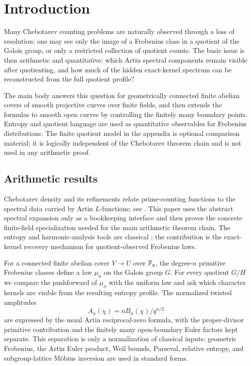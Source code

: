 \section{Introduction}\label{sec:introduction}
Many Chebotarev counting problems are naturally observed through a loss of resolution: one may see only the image of a Frobenius class in a quotient of the Galois group, or only a restricted collection of quotient counts. The basic issue is then arithmetic and quantitative: which Artin spectral components remain visible after quotienting, and how much of the hidden exact-kernel spectrum can be reconstructed from the full quotient profile?

The main body answers this question for geometrically connected finite \etale{} abelian covers of smooth projective curves over finite fields, and then extends the formulas to smooth open curves by controlling the finitely many boundary points. Entropy and quotient language are used as quantitative observables for Frobenius distributions. The finite quotient model in the appendix is optional comparison material; it is logically independent of the Chebotarev theorem chain and is not used in any arithmetic proof.

\subsection{Arithmetic results}
Chebotarev density and its refinements relate prime-counting functions to the spectral data carried by Artin \(L\)-functions; see \cite{Tschebotareff1926,Serre1981,NeukirchSchmidtWingberg2008}. This paper uses the abstract spectral expansion only as a bookkeeping interface and then proves the concrete finite-field specialization needed for the main arithmetic theorem chain. The entropy and harmonic-analysis tools are classical \cite{CoverThomas2006,CsiszarKorner2011,DemboZeitouni1998,Diaconis1988,Terras1999}; the contribution is the exact-kernel recovery mechanism for quotient-observed Frobenius laws.

For a connected finite \etale{} abelian cover \(V\to U\) over \(\mathbb{F}_q\), the degree-\(n\) primitive Frobenius classes define a law \(\mu_n\) on the Galois group \(G\).  For every quotient \(G/H\) we compare the pushforward of \(\mu_n\) with the uniform law and ask which character kernels are visible from the resulting entropy profile.  The normalized twisted amplitudes
\[
A_n(\chi)=nB_n(\chi)/q^{n/2}
\]
are expressed by the usual Artin reciprocal-zero formula, with the proper-divisor primitive contribution and the finitely many open-boundary Euler factors kept separate.  This separation is only a normalization of classical inputs: geometric Frobenius, the Artin Euler product, Weil bounds, Parseval, relative entropy, and subgroup-lattice M\"obius inversion are used in standard forms.

